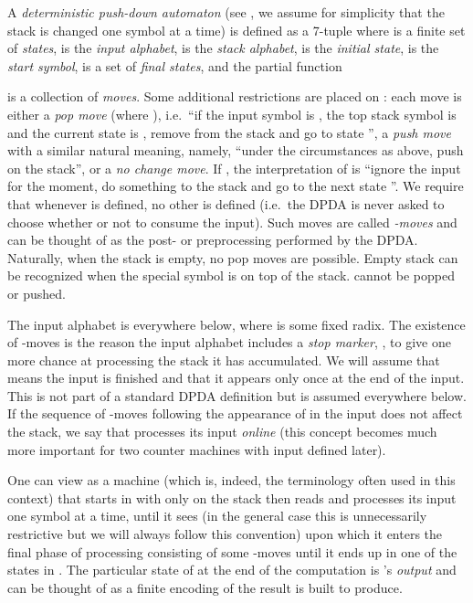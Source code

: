 \documentclass[12pt]{article}
\begin{document}
A {\it deterministic push-down automaton\/} (see \cite{hum}, we assume
for simplicity that the stack is changed one symbol at a time)  is defined as a 7-tuple  where  is a finite set of
{\it states},  is the {\it input alphabet},  is the {\it stack alphabet},
 is the {\it initial state},  is the {\it start
  symbol\/},  is a set of {\it final states\/}, and the
partial function

is a collection of {\it moves\/}. Some additional restrictions are
placed on : each move  is either a {\it pop
  move\/} (where ), i.e.~``if the input symbol is , the top stack symbol is
 and the current state is , remove  from the stack and go to
state '', a {\it
  push move\/} with a similar natural meaning, namely, ``under
the circumstances as above, push  on the stack'', or a {\it no change
  move\/}. If , the interpretation of
 is ``ignore the input for the moment, do
something to the stack and go to
the next state ''. We require that whenever  is
defined, no other  is defined (i.e.~the DPDA is
never asked to choose whether or not to consume the input). Such moves
are called {\it -moves\/}
and can be thought of as the post- or preprocessing performed by the
DPDA. Naturally, when the stack is empty, no pop moves are
possible. Empty stack can be recognized when the special symbol 
is on top of the stack.  cannot be popped or pushed.

The input alphabet is 
everywhere below, where  is some fixed radix.
The existence of -moves is the reason the input alphabet
includes a {\it stop
  marker\/}, , to give  one more chance at processing the
stack it has accumulated. We will assume that  means the input
is finished and that it appears only once at the end of the input. This
is not part of a standard DPDA definition but is assumed everywhere
below. If the sequence of -moves following
the appearance of  in the input does not affect the stack, we
say that  processes its input {\it online} (this concept becomes
much more important for two counter machines with input defined later).



One can view  as a machine (which is, indeed, the terminology often
used in this context) that starts in  with only  on the
stack then reads and processes its input one
symbol at a time, until it sees  (in the general case this is
unnecessarily restrictive but we will always follow this convention) upon
which it enters the final phase of processing consisting of some
-moves until it ends up in one of the states in . The
particular state of  at the end of the computation is 's {\it
output\/} and can be thought of as a finite encoding of the result 
is built to produce.
\end{document}
